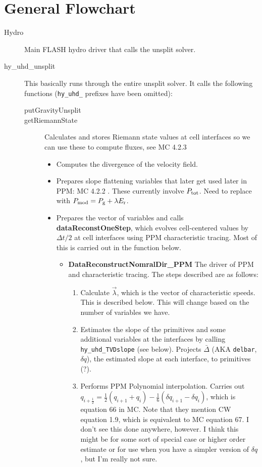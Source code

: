 \documentclass[preprint,11pt]{aastex}
\begin{document}
\section{General Flowchart}
\label{sec:flowchart}
\begin{description}
	\item[Hydro] Main FLASH hydro driver that calls the unsplit solver.
	\item[hy\_uhd\_unsplit] This basically runs through the entire unsplit solver.  It calls the following functions (\verb!hy_uhd_! prefixes have been omitted):
	\begin{description}
		\item[putGravityUnsplit]
		\item[getRiemannState]  Calculates and stores Riemann state values at cell interfaces so we can use these to compute fluxes, see MC 4.2.3
		\begin{itemize}
			\item Computes the divergence of the velocity field.
			\item Prepares slope flattening variables that later get used later in PPM: MC 4.2.2 . {\color{red} These currently involve $P_{\rm tot}$.} {\color{blue} Need to replace with $P_{\rm mod} = P_{\rm g} + \lambda E_{\rm r}$}.
			\item Prepares the vector of variables and calls \textbf{dataReconstOneStep}, which evolves cell-centered values by $\Delta t / 2$ at cell interfaces using PPM characteristic tracing.  Most of this is carried out in the function below.
			\begin{itemize}
				\item \textbf{DataReconstructNomralDir\_PPM} The driver of PPM and characteristic tracing.  The steps described are as follows:
				\begin{enumerate}
					\item Calculate $\vec{\lambda}$, which is the vector of characteristic speeds. {\color{red} This is described below.  This will change based on the number of variables we have.}
					\item Estimates the slope of the primitives and some additional variables at the interfaces by calling \verb!hy_uhd_TVDslope! (see below).  Projects $\bar{\Delta}$ (AKA \verb!delbar!, $\delta q$), the estimated slope at each interface, to primitives (?).%
					\item Performs PPM Polynomial interpolation.   Carries out $q_{i+\frac{1}{2}} = \frac{1}{2} \left( q_{i+1} + q_i \right) - \frac{1}{6} \left( \delta q_{i+1} - \delta q_i \right)$, which is equation 66 in MC.  Note that they mention CW equation 1.9, which is equivalent to MC equation 67.  I don't see this done anywhere, however.  I think this might be for some sort of special case or higher order estimate or for use when you have a simpler version of $\delta q$, but I'm really not sure.

\end{enumerate}
\end{itemize}
\end{itemize}
\end{description}
\end{description}
\end{document}
